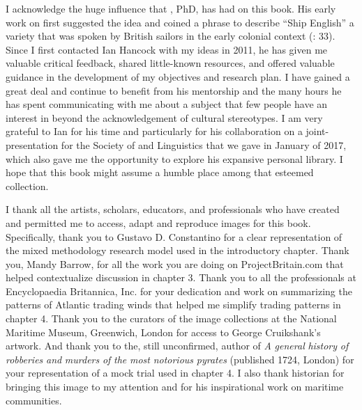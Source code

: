 I acknowledge the huge influence that , PhD, has had on this book. His early work on  first suggested the idea and coined a phrase to describe “Ship English” a variety that was spoken by British sailors in the early colonial context (\citealt{Hancock1976}: 33). Since I first contacted Ian Hancock with my ideas in 2011, he has given me valuable critical feedback, shared little-known resources, and offered valuable guidance in the development of my objectives and research plan. I have gained a great deal and continue to benefit from his mentorship and the many hours he has spent communicating with me about a subject that few people have an interest in beyond the acknowledgement of cultural stereotypes. I am very grateful to Ian for his time and particularly for his collaboration on a joint-presentation for the Society of  and  Linguistics that we gave in January of 2017, which also gave me the opportunity to explore his expansive personal library. I hope that this book might assume a humble place among that esteemed collection. 

I thank all the artists, scholars, educators, and professionals who have created and permitted me to access, adapt and reproduce images for this book. Specifically, thank you to Gustavo D. Constantino for a clear representation of the mixed methodology research model used in the introductory chapter. Thank you, Mandy Barrow, for all the work you are doing on ProjectBritain.com that helped contextualize discussion in chapter 3. Thank you to all the professionals at Encyclopaedia Britannica, Inc. for your dedication and work on summarizing the patterns of Atlantic trading winds that helped me simplify trading patterns in chapter 4. Thank you to the curators of the image collections at the National Maritime Museum, Greenwich, London for access to George Cruikshank’s artwork. And thank you to the, still unconfirmed, author of \textit{A} \textit{general} \textit{history} \textit{of} \textit{robberies} \textit{and} \textit{murders} \textit{of} \textit{the} \textit{most} \textit{notorious} \textit{pyrates} (published 1724, London) for your representation of a mock trial used in chapter 4. I also thank historian  for bringing this image to my attention and for his inspirational work on maritime communities. 


